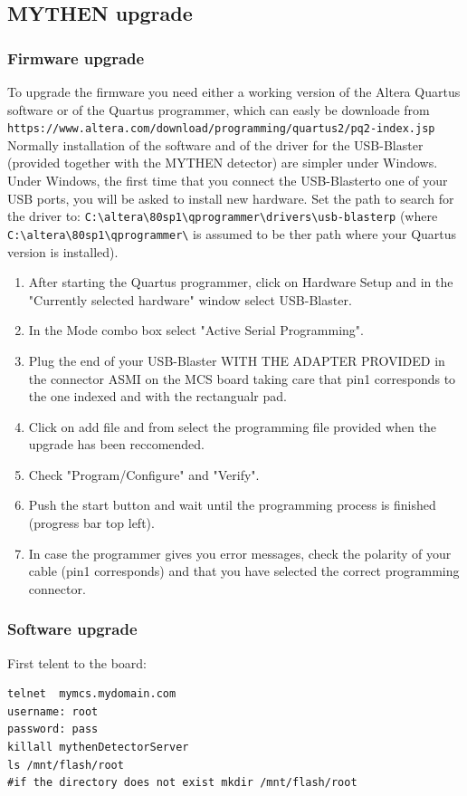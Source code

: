 \documentclass{article}
\begin{document}
\subsection{MYTHEN upgrade}
\subsubsection{Firmware upgrade}

To upgrade the firmware you need either a working version of the Altera Quartus software or of the Quartus programmer, which can easly be downloade from \\
\verb=https://www.altera.com/download/programming/quartus2/pq2-index.jsp= \\
Normally installation of the software and of the driver for the USB-Blaster (provided together with the MYTHEN detector) are simpler under Windows.\\
Under Windows, the first time that you connect the USB-Blasterto one of your USB ports, you will be asked to install new hardware. Set the path to search
for the driver to: \verb=C:\altera\80sp1\qprogrammer\drivers\usb-blasterp= (where  \verb=C:\altera\80sp1\qprogrammer\= is assumed to be ther path where your Quartus version is installed).\\
\begin{enumerate}
\item After starting the Quartus programmer, click on Hardware Setup and in the "Currently selected hardware" window select USB-Blaster.
\item In the Mode combo box select "Active Serial Programming".
\item Plug the end of your USB-Blaster WITH THE ADAPTER PROVIDED in the connector ASMI on the MCS board taking care that pin1 corresponds to the one indexed and with the rectangualr pad.
\item Click on add file and from select the programming file provided when the upgrade has been reccomended.
\item Check "Program/Configure" and "Verify".
\item Push the start button and wait until the programming process is finished (progress bar top left).
\item In case the programmer gives you error messages, check the polarity of your cable (pin1 corresponds) and that you have selected the correct programming connector.
\end{enumerate}

\subsubsection{Software upgrade}
First telent to the board:
\begin{verbatim}
telnet  mymcs.mydomain.com
username: root
password: pass
killall mythenDetectorServer
ls /mnt/flash/root
#if the directory does not exist mkdir /mnt/flash/root
\end{verbatim}
\end{document}
